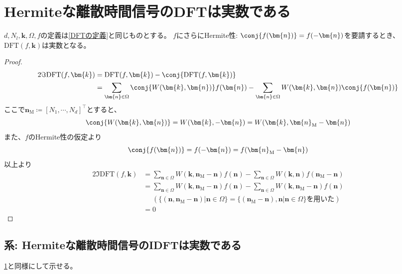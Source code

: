 			\section{Hermiteな離散時間信号のDFTは実数である}
				\label{Hermiteな離散時間信号のDFTは実数である}
				\begin{shadebox}
					$d,N_l,\bm{k},\Omega,f$の定義は\ref{DFTの定義}と同じものとする。
					$f$にさらにHermite性: $\conj{f(\bm{n})} = f(-\bm{n})$を要請するとき、$\text{DFT}(f,\bm{k})$は実数となる。
				\end{shadebox}
				\begin{proof}
					\begin{align*}
						2\Im{\text{DFT}(f,\bm{k})} &= \text{DFT}(f,\bm{k}) - \conj{\text{DFT}(f,\bm{k})} \\
						&= \sum_{\bm{n}\in\Omega} \conj{W(\bm{k},\bm{n})}f(\bm{n}) - \sum_{\bm{n} \in \Omega}W(\bm{k},\bm{n})\conj{f(\bm{n})}
					\end{align*}
					ここで$\bm{n}_\text{M} \coloneqq [N_1,\cdots,N_d]^\top$とすると、
					\[ \conj{W(\bm{k},\bm{n})} = W(\bm{k},-\bm{n}) = W(\bm{k},\bm{n}_\text{M}-\bm{n}) \]
					また、$f$のHermite性の仮定より
					\[ \conj{f(\bm{n})} = f(-\bm{n}) = f(\bm{n}_\text{M}-\bm{n}) \]
					以上より
					\begin{align*}
						2\Im{\text{DFT}(f,\bm{k})} &= \sum_{\bm{n}\in\Omega} W(\bm{k},\bm{n}_\text{M}-\bm{n})f(\bm{n}) - \sum_{\bm{n} \in \Omega}W(\bm{k},\bm{n})f(\bm{n}_\text{M}-\bm{n}) \\
						&= \sum_{\bm{n}\in\Omega} W(\bm{k},\bm{n}_\text{M}-\bm{n})f(\bm{n}) - \sum_{\bm{n}\in\Omega} W(\bm{k},\bm{n}_\text{M}-\bm{n})f(\bm{n}) \\
						&\phantom{=} (\{(\bm{n}, \bm{n}_\text{M}-\bm{n}) | \bm{n}\in\Omega\} = \{(\bm{n}_\text{M}-\bm{n}), \bm{n} | \bm{n}\in\Omega\}\text{を用いた}) \\
						&= 0
					\end{align*}
				\end{proof}

			\subsection{系: Hermiteな離散時間信号のIDFTは実数である}
				\ref{Hermiteな離散時間信号のDFTは実数である}と同様にして示せる。

